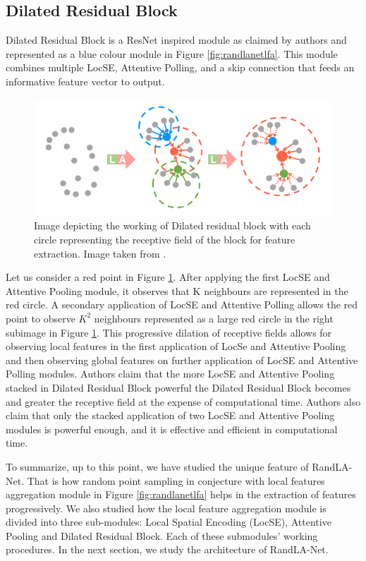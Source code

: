 \subsection{Dilated Residual Block}
Dilated Residual Block is a ResNet inspired module as claimed by authors and represented as a blue colour module in Figure \ref{fig:randlanetlfa}.
This module combines multiple LocSE, Attentive Polling, and a skip connection that feeds an informative feature vector to output.
\begin{figure}
    \centering
    \includegraphics[scale=0.5]{images/dilatedresidualblock.png}
    \caption{Image depicting the working of Dilated residual block with each circle representing the receptive field of the block for feature extraction. Image taken from \cite{Hu_2020_CVPR_Randla}.}
    \label{fig:dilatedresidualblock}
\end{figure}
Let us consider a red point in Figure \ref{fig:dilatedresidualblock}. After applying the first LocSE and Attentive Pooling module, it observes that K neighbours are represented in the red circle.
A secondary application of LocSE and Attentive Polling allows the red point to observe $K^{2}$ neighbours represented as a large red circle in the right subimage in Figure \ref{fig:dilatedresidualblock}.
This progressive dilation of receptive fields allows for observing local features in the first application of LocSe and Attentive Pooling and then observing global features on further application of LocSE and Attentive Polling modules.
Authors claim that the more LocSE and Attentive Pooling stacked in Dilated Residual Block powerful the Dilated Residual Block becomes and greater the receptive field at the expense of computational time.
Authors also claim that only the stacked application of two LocSE and Attentive Pooling modules is powerful enough, and it is effective and efficient in computational time.

To summarize, up to this point, we have studied the unique feature of RandLA-Net. That is how random point sampling in conjecture with local features aggregation module in Figure \ref{fig:randlanetlfa} helps in the extraction of features progressively.
We also studied how the local feature aggregation module is divided into three sub-modules: Local Spatial Encoding (LocSE), Attentive Pooling and Dilated Residual Block. Each of these submodules' working procedures.
In the next section, we study the architecture of RandLA-Net.

